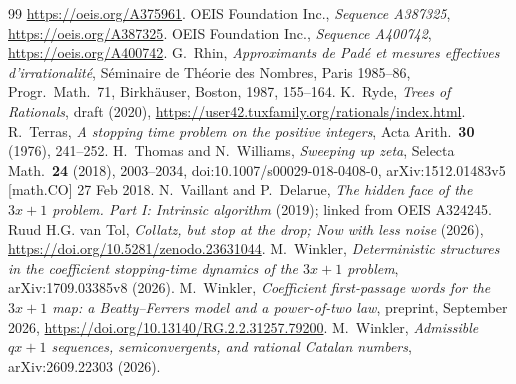 \documentclass[10pt,a4paper,titlepage]{article}
\begin{document}
\begin{thebibliography}{99}
  \url{https://oeis.org/A375961}.
 OEIS Foundation Inc., \emph{Sequence A387325},
  \url{https://oeis.org/A387325}.
 OEIS Foundation Inc., \emph{Sequence A400742},
  \url{https://oeis.org/A400742}.
 G.~Rhin, \emph{Approximants de Pad\'e et mesures effectives
  d'irrationalit\'e}, S\'eminaire de Th\'eorie des Nombres, Paris 1985--86,
  Progr.\ Math.\ 71, Birkh\"auser, Boston, 1987, 155--164.
 K.~Ryde, \emph{Trees of Rationals}, draft (2020),
  \url{https://user42.tuxfamily.org/rationals/index.html}.
 R.~Terras, \emph{A stopping time problem on the positive
  integers}, Acta Arith.\ \textbf{30} (1976), 241--252.
 H.~Thomas and N.~Williams, \emph{Sweeping up zeta},
  Selecta Math.\ \textbf{24} (2018), 2003--2034, doi:10.1007/s00029-018-0408-0,
  arXiv:1512.01483v5 [math.CO] 27 Feb 2018.
 N.~Vaillant and P.~Delarue, \emph{The hidden face of the
  $3x+1$ problem. Part I: Intrinsic algorithm} (2019); linked from OEIS A324245.
 Ruud H.G. van Tol, \emph{Collatz, but stop at the drop; Now with less noise}
  (2026), \url{https://doi.org/10.5281/zenodo.23631044}.
 M.~Winkler, \emph{Deterministic structures in the
  coefficient stopping-time dynamics of the $3x+1$ problem}, arXiv:1709.03385v8 (2026).
 M.~Winkler, \emph{Coefficient first-passage words for
  the $3x+1$ map: a Beatty--Ferrers model and a power-of-two law}, preprint,
  September 2026, \url{https://doi.org/10.13140/RG.2.2.31257.79200}.
 M.~Winkler, \emph{Admissible $qx+1$ sequences,
  semiconvergents, and rational Catalan numbers}, arXiv:2609.22303 (2026).
\end{thebibliography}

\printindex
\end{document}
